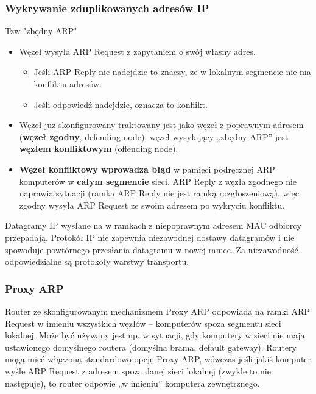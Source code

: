 \documentclass[../main.tex]{subfiles}
\begin{document}
    \subsubsection{Wykrywanie zduplikowanych adresów IP}
    Tzw "zbędny ARP"
    \begin{itemize}
        \item Węzeł wysyła ARP Request z zapytaniem o swój własny adres.
        \begin{itemize}
            \item Jeśli ARP Reply nie nadejdzie to znaczy, że w lokalnym segmencie nie ma konfliktu adresów.
            \item Jeśli odpowiedź nadejdzie, oznacza to konflikt.
        \end{itemize}
        \item Węzeł już skonfigurowany traktowany jest jako węzeł z poprawnym adresem (\textbf{węzeł zgodny}, defending node), węzeł
        wysyłający „zbędny ARP” jest \textbf{węzłem konfliktowym} (offending node).
        \item \textbf{Węzeł konfliktowy wprowadza błąd} w pamięci podręcznej ARP komputerów w \textbf{całym segmencie} sieci. ARP Reply z węzła zgodnego nie naprawia sytuacji (ramka ARP Reply nie jest ramką rozgłoszeniową), więc zgodny wysyła ARP Request ze swoim adresem po wykryciu konfliktu.
    \end{itemize}
    Datagramy IP wysłane na w ramkach z niepoprawnym adresem MAC odbiorcy
    przepadają. Protokół IP nie zapewnia niezawodnej dostawy datagramów i nie
    spowoduje powtórnego przesłania datagramu w nowej ramce. Za niezawodność
    odpowiedzialne są protokoły warstwy transportu.

    \subsubsection{Proxy ARP}
    Router ze skonfigurowanym mechanizmem Proxy ARP odpowiada na ramki ARP Request w
    imieniu wszystkich węzłów – komputerów spoza segmentu sieci lokalnej. Może
    być używany jest np. w sytuacji, gdy komputery w sieci nie mają ustawionego domyślnego
    routera (domyślna brama, default gateway). Routery mogą mieć włączoną standardowo
    opcję Proxy ARP, wówczas jeśli jakiś komputer wyśle ARP Request z adresem spoza danej
    sieci lokalnej (zwykle to nie następuje), to router odpowie „w imieniu” komputera
    zewnętrznego.
\end{document}

